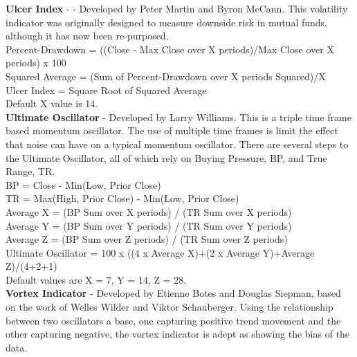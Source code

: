 \documentclass[12pt,a4paper]{article}
\begin{document}
\iffalse
[]
\fi

\noindent
\textbf{Ulcer Index} - \cite{Martin1992} - Developed by Peter Martin and Byron McCann. This volatility indicator was originally designed to measure downside risk in mutual funds, although it has now been re-purposed.  \\

\noindent
Percent-Drawdown = ((Close - Max Close over X periods)/Max Close over X periods) x 100\\
Squared Average = (Sum of Percent-Drawdown over X periods Squared)/X\\
Ulcer Index = Square Root of Squared Average\\
Default X value is 14.\\

\iffalse
[]
\fi

\noindent
\textbf{Ultimate Oscillator} - Developed by Larry Williams. This is a triple time frame based momentum oscillator. The use of multiple time frames is limit the effect that noise can have on a typical momentum oscillator. There are several steps to the Ultimate Oscillator, all of which rely on Buying Pressure, BP, and True Range, TR.\\

\noindent
BP = Close - Min(Low, Prior Close)\\
TR = Max(High, Prior Close)  -  Min(Low, Prior Close)\\

\noindent
Average X = (BP Sum over X periods) / (TR Sum over X periods)\\
Average Y = (BP Sum over Y periods) / (TR Sum over Y periods)\\
Average Z = (BP Sum over Z periods) / (TR Sum over Z periods)\\

\noindent
Ultimate Oscillator = 100 x ((4 x Average X)+(2 x Average Y)+Average Z)/(4+2+1)\\
Default values are X = 7, Y = 14, Z = 28.\\

\iffalse
[]
\fi

\noindent
\textbf{Vortex Indicator} - Developed by Etienne Botes and Douglas Siepman, based on the work of Welles Wilder and Viktor Schauberger. Using the relationship between two oscillators a base, one capturing positive trend movement and the other capturing negative, the vortex indicator is adept as showing the bias of the data.\\
\end{document}
